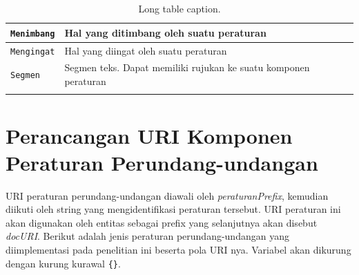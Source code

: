 \begin{longtable}[l]{|p{}|p{}|}
  \texttt{Menimbang}      & Hal yang ditimbang oleh suatu peraturan                                                         \\ \hline
  \texttt{Mengingat}      & Hal yang diingat oleh suatu peraturan                                                           \\ \hline
  \texttt{Segmen}         & Segmen teks. Dapat memiliki rujukan ke suatu komponen peraturan                                 \\ \hline
  \caption{Long table caption.\label{longsz}}                                                                                                  \\
\end{longtable}

\section{Perancangan URI Komponen Peraturan
  Perundang-undangan}\label{perancangan-uri-komponen-peraturan-perundang-undangan}

URI peraturan perundang-undangan diawali oleh \emph{peraturanPrefix}, kemudian diikuti oleh string
yang mengidentifikasi peraturan tersebut. URI peraturan ini akan digunakan oleh entitas sebagai
prefix yang selanjutnya akan disebut \emph{docURI}. Berikut adalah jenis peraturan
perundang-undangan yang diimplementasi pada penelitian ini beserta pola URI nya. Variabel akan
dikurung dengan kurung kurawal \texttt{\{\}}.



